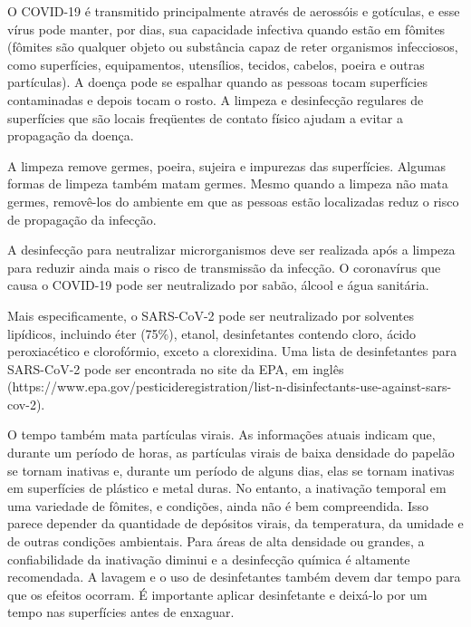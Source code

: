 \documentclass[onecolumn,journal]{IEEEtran}
\begin{document}


\begin{multicols}{2}

O COVID-19 é transmitido principalmente através de aerossóis e gotículas, e esse vírus pode manter, por dias, sua capacidade infectiva quando estão em fômites (fômites são qualquer objeto ou substância capaz de reter organismos infecciosos, como superfícies, equipamentos, utensílios, tecidos, cabelos, poeira e outras partículas). A doença pode se espalhar quando as pessoas tocam superfícies contaminadas e depois tocam o rosto. A limpeza e desinfecção regulares de superfícies que são locais freqüentes de contato físico ajudam a evitar a propagação da doença.

A limpeza remove germes, poeira, sujeira e impurezas das superfícies. Algumas formas de limpeza também matam germes. Mesmo quando a limpeza não mata germes, removê-los do ambiente em que as pessoas estão localizadas reduz o risco de propagação da infecção.

A desinfecção para neutralizar microrganismos deve ser realizada após a limpeza para reduzir ainda mais o risco de transmissão da infecção. O coronavírus que causa o COVID-19 pode ser neutralizado por sabão, álcool e água sanitária.

Mais especificamente, o SARS-CoV-2 pode ser neutralizado por solventes lipídicos, incluindo éter (75\%), etanol, desinfetantes contendo cloro, ácido peroxiacético e clorofórmio, exceto a clorexidina. Uma lista de desinfetantes para SARS-CoV-2 pode ser encontrada no site da EPA, em inglês (https://www.epa.gov/pesticideregistration/list-n-disinfectants-use-against-sars-cov-2).

O tempo também mata partículas virais. As informações atuais indicam que, durante um período de horas, as partículas virais de baixa densidade do papelão se tornam inativas e, durante um período de alguns dias, elas se tornam inativas em superfícies de plástico e metal duras. No entanto, a inativação temporal em uma variedade de fômites, e condições, ainda não é bem compreendida. Isso parece depender da quantidade de depósitos virais, da temperatura, da umidade e de outras condições ambientais. Para áreas de alta densidade ou grandes, a confiabilidade da inativação diminui e a desinfecção química é altamente recomendada. A lavagem e o uso de desinfetantes também devem dar tempo para que os efeitos ocorram. É importante aplicar desinfetante e deixá-lo por um tempo nas superfícies antes de enxaguar.


\end{multicols}
\end{document}
